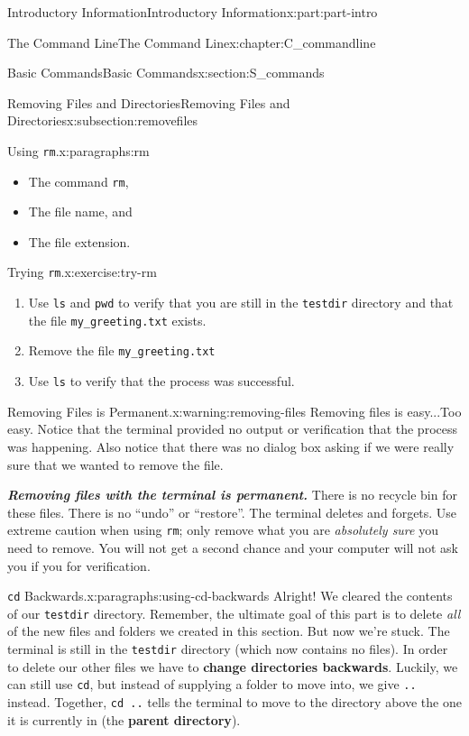 \documentclass[oneside,10pt,]{book}
\newcommand{\mono}[1]{\texttt{#1}}
\newcommand{\alert}[1]{\textbf{\textit{#1}}}
\newcommand{\terminology}[1]{\textbf{#1}}
\begin{document}
\begin{partptx}{Introductory Information}{}{Introductory Information}{}{}{x:part:part-intro}
\begin{chapterptx}{The Command Line}{}{The Command Line}{}{}{x:chapter:C_commandline}
\begin{sectionptx}{Basic Commands}{}{Basic Commands}{}{}{x:section:S_commands}
\begin{subsectionptx}{Removing Files and Directories}{}{Removing Files and Directories}{}{}{x:subsection:removefiles}
\begin{paragraphs}{Using \mono{rm}.}{x:paragraphs:rm}
\begin{itemize}[label=\textbullet]
\item{}The command \mono{rm},%
\item{}The file name, and%
\item{}The file extension.%
\end{itemize}
%
\begin{inlineexercise}{Trying \mono{rm}.}{x:exercise:try-rm}%
\begin{enumerate}[font=\bfseries,label=(\alph*),ref=\alph*]
\item{}Use \mono{ls} and \mono{pwd} to verify that you are still in the \mono{testdir} directory and that the file \mono{my\_greeting.txt} exists.%
\item{}Remove the file \mono{my\_greeting.txt}%
\item{}Use \mono{ls} to verify that the process was successful.%
\end{enumerate}
\end{inlineexercise}%
\begin{warning}{Removing Files is Permanent.}{x:warning:removing-files}%
%
Removing files is easy...Too easy. Notice that the terminal provided no output or verification that the process was happening. Also notice that there was no dialog box asking if we were really sure that we wanted to remove the file.%
\par
\alert{Removing files with the terminal is permanent.} There is no recycle bin for these files. There is no ``undo'' or ``restore''. The terminal deletes and forgets. Use extreme caution when using \mono{rm}; only remove what you are \emph{absolutely sure} you need to remove. You will not get a second chance and your computer will not ask you if you for verification.%
\end{warning}
\end{paragraphs}%
\begin{paragraphs}{\mono{cd} Backwards.}{x:paragraphs:using-cd-backwards}%
\index{\mono{cd}}%
\index{\mono{cd}!backwards}%
%
\index{backwards \mono{cd}}%
\index{command line!\mono{cd}}%
Alright! We cleared the contents of our \mono{testdir} directory. Remember, the ultimate goal of this part is to delete \emph{all} of the new files and folders we created in this section. But now we're stuck. The terminal is still in the \mono{testdir} directory (which now contains no files). In order to delete our other files we have to \terminology{change directories backwards}. Luckily, we can still use \mono{cd}, but instead of supplying a folder to move into, we give \mono{..} instead. Together, \mono{cd ..} tells the terminal to move to the directory above the one it is currently in (the \terminology{parent directory}).%

\end{paragraphs}
\end{subsectionptx}
\end{sectionptx}
\end{chapterptx}
\end{partptx}
\end{document}

